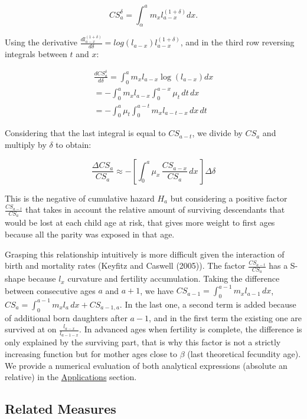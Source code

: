 \documentclass[
]{article}
\begin{document}
\[CS_{a}^\delta = \int_{\alpha}^{a} {m_{x} l_{a-x}^{(1+\delta)}} dx.\]

Using the derivative
\(\frac{dl_{a-x}^{(1+\delta)}}{d\delta} = log(l_{a-x}) l_{a-x}^{(1+\delta)}\),
and in the third row reversing integrals between \(t\) and \(x\):

\[
\begin{aligned}
\frac{d CS_{a}^\delta}{d \delta} = \int_{0}^{a} {m_{x} l_{a-x} \log(l_{a-x}) dx}\\
= - \int_{0}^{a} {m_{x} l_{a-x} \int_{0}^{a-x}{\mu_t \, dt}\, dx}\\
= - \int_{0}^{a}{\mu_t} \int_{0}^{a-t} {m_{x} l_{a-t-x} \, dx}\, dt
\end{aligned}
\]

Considering that the last integral is equal to \(CS_{a-t}\), we divide
by \(CS_a\) and multiply by \(\delta\) to obtain:

\[\frac{\Delta CS_{a}}{CS_a} \approx - \left[\int_{0}^{a}{\mu_x  \, \frac{CS_{a-x}}{CS_a} \,dx \,}\right] \Delta \delta\]

This is the negative of cumulative hazard \(H_a\) but considering a
positive factor \(\frac{CS_{a-t}}{CS_a}\) that takes in account the
relative amount of surviving descendants that would be lost at each
child age at risk, that gives more weight to first ages because all the
parity was exposed in that age.

Grasping this relationship intuitively is more difficult given the
interaction of birth and mortality rates (Keyfitz and Caswell (2005)).
The factor \(\frac{CS_{a-t}}{CS_a}\) has a S-shape because \(l_x\)
curvature and fertility accumulation. Taking the difference between
consecutive ages \(a\) and \(a+1\), we have
\(CS_{a-1}=\int_{0}^{a-1} {m_{x} l_{a-1} \, dx}\),
\(CS_{a}=\int_{0}^{a-1} {m_{x} l_{a} \, dx}+CS_{a-1,a}\). In the last
one, a second term is added because of additional born daughters after
\(a-1\), and in the first term the existing one are survived at on
\(\frac{l_{a-x}}{l_{a-1-x}}\). In advanced ages when fertility is
complete, the difference is only explained by the surviving part, that
is why this factor is not a strictly increasing function but for mother
ages close to \(\beta\) (last theoretical fecundity age). We provide a
numerical evaluation of both analytical expressions (absolute an
relative) in the \protect\hyperlink{Applications}{Applications} section.

\hypertarget{related-measures}{%
\subsection{Related Measures}\label{related-measures}}
\end{document}
